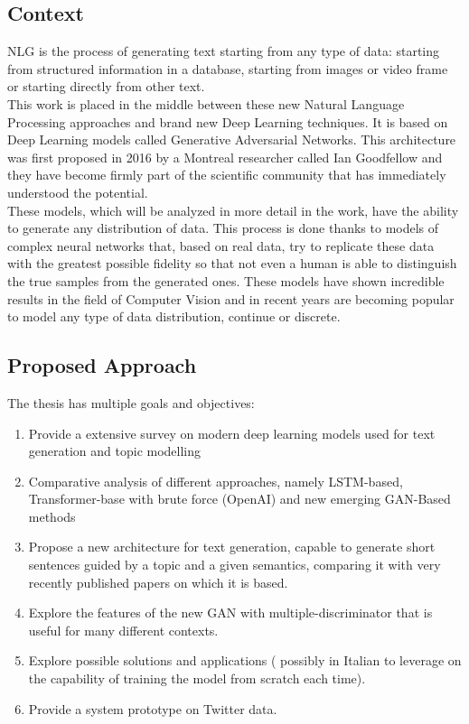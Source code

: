\subsection{Context}
NLG is the process of generating text starting from any type of data: starting from structured information in a database, starting from images or video frame or starting directly from other text. \\
This work is placed in the middle between these new Natural Language Processing approaches and brand new Deep Learning techniques. It is based on Deep Learning models called Generative Adversarial Networks. This architecture was first proposed in 2016 by a Montreal researcher called Ian Goodfellow \cite{GoodfellowGAN} and they have become firmly part of the scientific community that has immediately understood the potential. \\
These models, which will be analyzed in more detail in the work, have the ability to generate any distribution of data. This process is done thanks to models of complex neural networks that, based on real data, try to replicate these data with the greatest possible fidelity so that not even a human is able to distinguish the true samples from the generated ones. These models have shown incredible results in the field of Computer Vision and in recent years are becoming popular to model any type of data distribution, continue or discrete.

\subsection{Proposed Approach}
The thesis has multiple goals and objectives:
\begin{enumerate}
	\item Provide a extensive survey on modern deep learning models used for text generation and topic modelling
	\item Comparative analysis of different approaches, namely LSTM-based, Transformer-base with brute force (OpenAI) and new emerging GAN-Based methods
	\item Propose a new architecture for text generation, capable to generate short sentences guided by a topic and a given semantics, comparing it with very recently published papers on which it is based.
	\item Explore the features of the new GAN with multiple-discriminator that is useful for many different contexts. 
	\item Explore possible solutions and applications ( possibly in Italian to leverage on the capability of training the model from scratch each time). 
	\item Provide a system prototype on Twitter data.
	
\end{enumerate}

